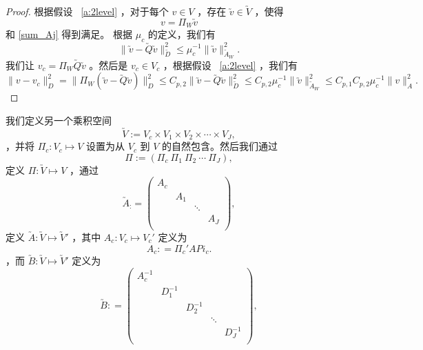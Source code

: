 \documentclass[12pt]{acta_2011xz}
\begin{document}
   \begin{proof}根据假设~    \ref{a:2level}    ，对于每个    $v\in V$    ，存在    $\utilde v\in \utilde V$    ，使得 
   \begin{equation}
            v=\Pi_W\utilde v
        \end{equation}    和    \eqref{sum_Aj}    得到满足。
根据    $\mu_c$    的定义，我们有
   \begin{equation}
            \|\utilde v-\utilde Q\utilde v\|_{\utilde D}^2\le \mu_c^{-1} \|\utilde v\|_{\utilde A_W}^2.
        \end{equation}    我们让    $v_c=\Pi_W\utilde Q\utilde v$    。然后是    $v_c\in V_c$    ，根据假设~    \ref{a:2level}    ，我们有
   \begin{equation*}
            \|v-v_c\|_D^2 =  \|\Pi_W(\utilde v- \utilde Q\utilde v)\|_D^2 \le  C_{p,2}\|\utilde v-\utilde Q\utilde v\|_{\utilde D}^2 \le  C_{p,2}\mu_c^{-1}\|\utilde v\|_{\utilde A_W}^2\le  C_{p,1}C_{p,2}\mu_c^{-1}\|v\|_A^2.
        \end{equation*}     \end{proof}     

我们定义另一个乘积空间
   \begin{equation}
    \utilde{V}:= V_c\times V_1\times V_2\times \cdots \times V_J,
\end{equation}   ，并将    $\Pi_c: V_c\mapsto V$    设置为从    $V_c$    到    $V$    的自然包含。然后我们通过
   \begin{equation}
    \Pi:=(\Pi_c~\Pi_1~\Pi_2~\cdots~\Pi_J),
\end{equation}    定义    $\Pi: \utilde V\mapsto V$   ，通过
   \begin{equation}
  \utilde A_: = \begin{pmatrix}
      A_c & & &  \\ 
      & A_1 & &  \\ 
      & & \ddots &  \\ 
      & & & A_J  \\ 
      \end{pmatrix},
\end{equation}    定义    $\utilde A: \utilde V\mapsto \utilde V'$   ，其中    $A_c: V_c\mapsto V_c'$    定义为
   \begin{equation}
    A_c: =\Pi_c'APi_c.
\end{equation}   ，而    $\utilde B: \utilde V\mapsto \utilde V'$    定义为
   \begin{equation}
    \utilde B: = \begin{pmatrix}
      A_c^{-1} & & & & \\ 
      & D_1^{-1} & & & \\ 
      & & D_2^{-1} & & \\ 
      & & & \ddots & \\ 
      & & & & D_J^{-1} \\ 
      \end{pmatrix},
\end{equation}     
\end{document}
